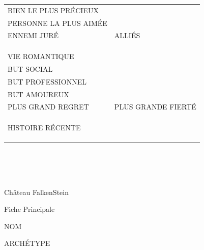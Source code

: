 \documentclass[a5paper]{letter}
\begin{document}
{{\begin{tabular}[c]{ p{} p{} }
	BIEN LE PLUS PRÉCIEUX	&									\\
	PERSONNE LA PLUS AIMÉE	&									\\
	ENNEMI JURÉ				&		ALLIÉS						\\
							&									\\
							&									\\
							&									\\
	VIE ROMANTIQUE			&									\\
	BUT SOCIAL				&									\\
	BUT PROFESSIONNEL		&									\\
	BUT AMOUREUX			&									\\
	PLUS GRAND REGRET		&		PLUS GRANDE FIERTÉ			\\
							&									\\
							&									\\
							&									\\
	HISTOIRE RÉCENTE		&									\\
							&									\\
							&									\\
							&									\\
\end{tabular}

\clearpage

\hfill~\\ \dotfill~\\ \hfill~\\

\clearpage

{\centering \Huge{Château FalkenStein}~\\
{\centering \large{Fiche Principale}~\\


\begin{minipage}[ht]{0.48\textwidth}
	NOM~\newline~\newline
\end{minipage} \hfill \begin{minipage}[ht]{0.48\textwidth}
	ARCHÉTYPE~\newline~\newline
\end{minipage}~\\~\\

}}}}
\end{document}
